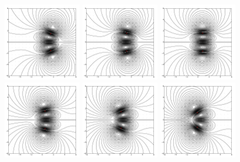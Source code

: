\documentclass[12pt]{amsart}
\theoremstyle{remark}
\begin{document}
\begin{figure}[h!]
	\centering
	\includegraphics[width=0.3\textwidth]{./images/moi_frames/time_0}
	\includegraphics[width=0.3\textwidth]{./images/moi_frames/time_1p7}
	\includegraphics[width=0.3\textwidth]{./images/moi_frames/time_3p4}
	\includegraphics[width=0.3\textwidth]{./images/moi_frames/time_5}
	\includegraphics[width=0.3\textwidth]{./images/moi_frames/time_6p7}
	\includegraphics[width=0.3\textwidth]{./images/moi_frames/time_8p4}

\end{figure}
\end{document}
